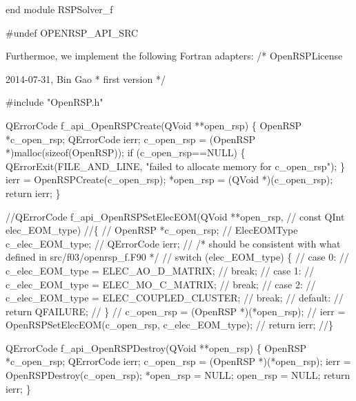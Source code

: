 end module RSPSolver_f

#undef OPENRSP_API_SRC
\nwendcode{}\nwdocspar

Furthermoe, we implement the following Fortran adapters:
\nwenddocs{}\endmoddef
/*
  \LA{}OpenRSPLicense~{\nwtagstyle{}}\RA{}

   2014-07-31, Bin Gao
   * first version
*/

#include "OpenRSP.h"

QErrorCode f_api_OpenRSPCreate(QVoid **open_rsp)
\{
    OpenRSP *c_open_rsp;
    QErrorCode ierr;
    c_open_rsp = (OpenRSP *)malloc(sizeof(OpenRSP));
    if (c_open_rsp==NULL) \{
        QErrorExit(FILE_AND_LINE, "failed to allocate memory for c_open_rsp");
    \}
    ierr = OpenRSPCreate(c_open_rsp);
    *open_rsp = (QVoid *)(c_open_rsp);
    return ierr;
\}

//QErrorCode f_api_OpenRSPSetElecEOM(QVoid **open_rsp,
//                                   const QInt elec_EOM_type)
//\{
//    OpenRSP *c_open_rsp;
//    ElecEOMType c_elec_EOM_type;
//    QErrorCode ierr;
//    /* should be consistent with what defined in src/f03/openrsp_f.F90 */
//    switch (elec_EOM_type) \{
//    case 0:
//        c_elec_EOM_type = ELEC_AO_D_MATRIX;
//        break;
//    case 1:
//        c_elec_EOM_type = ELEC_MO_C_MATRIX;
//        break;
//    case 2:
//        c_elec_EOM_type = ELEC_COUPLED_CLUSTER;
//        break;
//    default:
//        return QFAILURE;
//    \}
//    c_open_rsp = (OpenRSP *)(*open_rsp);
//    ierr = OpenRSPSetElecEOM(c_open_rsp, c_elec_EOM_type);
//    return ierr;
//\}

QErrorCode f_api_OpenRSPDestroy(QVoid **open_rsp)
\{
    OpenRSP *c_open_rsp;
    QErrorCode ierr;
    c_open_rsp = (OpenRSP *)(*open_rsp);
    ierr = OpenRSPDestroy(c_open_rsp);
    *open_rsp = NULL;
    open_rsp = NULL;
    return ierr;
\}

\nwendcode{}

